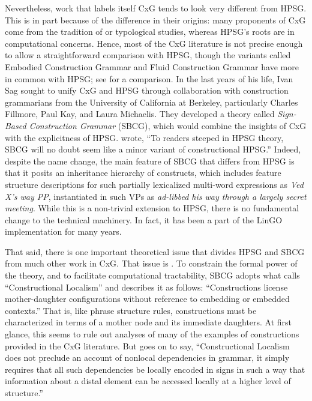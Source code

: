 \documentclass[output=paper]{langsci/langscibook}
\begin{document}
Nevertheless, work that labels itself CxG tends to look very different from HPSG.  This is in part because of the difference in their origins: many proponents of CxG come from the tradition of  or typological studies, whereas HPSG's roots are in computational concerns. Hence, most of the CxG literature is not precise enough to allow a straightforward comparison with HPSG, though the variants called Embodied Construction Grammar and Fluid Construction Grammar have more in common with HPSG; see \citet{MuellerFCG} for a comparison.  In the last years of his life, Ivan Sag sought to unify CxG and HPSG through collaboration with construction grammarians from the University of California at Berkeley, particularly Charles Fillmore, Paul Kay, and Laura Michaelis.  They developed a theory called \emph{Sign-Based Construction Grammar} (SBCG), which would combine the insights of CxG with the explicitness of HPSG.  \citet[]{Sag2012a} wrote, ``To readers steeped in HPSG theory, SBCG will no doubt seem like a minor variant of constructional HPSG.''  Indeed, despite the name change, the main feature of SBCG that differs from HPSG is that it posits an inheritance hierarchy of constructs, which includes feature structure descriptions for such partially lexicalized multi-word expressions as \emph{Ved X's way PP}, instantiated in such VPs as \textit{ad-libbed his way through a largely secret meeting}.  While this is a non-trivial extension to HPSG, there is no fundamental change to the technical machinery.  In fact, it has been a part of the LinGO implementation for many years.

That said, there is one important theoretical issue that divides HPSG and SBCG from much other work in CxG.  That issue is .  To constrain the formal power of the theory, and to facilitate computational tractability, SBCG adopts what \citet[]{Sag2012a} calls ``Constructional Localism'' and describes it as follows:  ``Constructions license mother-daughter configurations without reference to embedding or embedded contexts.''  That is, like phrase structure rules, constructions must be characterized in terms of a mother node and its immediate daughters.  At first glance, this seems to rule out analyses of many of the examples of constructions provided in the CxG literature.  But  \citet[]{Sag2012a} goes on to say, ``Constructional Localism does not preclude an account of nonlocal dependencies in grammar, it simply requires that all such dependencies be locally encoded in signs in such a way that information about a distal element can be accessed locally at a higher level of structure.''
\end{document}
